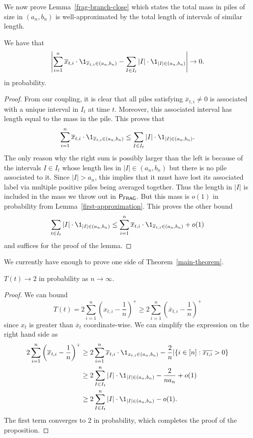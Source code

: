 \documentclass[12pt]{article}
\begin{document}
We now prove Lemma~\ref{frag-branch-close} which states the total mass in piles of size in $(a_n, b_n)$ is well-approximated by the total length of intervals of similar length. 
\begin{lem} \label{frag-branch-close}
	We have that
	\[
		\left | \sum_{i = 1}^n \overline{x}_{t, i} \cdot \1_{\overline{x}_{t, i} \in (a_n, b_n)} - \sum_{I \in I_t} |I| \cdot \1_{|I| \in (a_n, b_n)} \right | \to 0. 
	\]
	in probability. 
\end{lem}	
\begin{proof}
	From our coupling, it is clear that all piles satisfying $\overline{x}_{t, i} \neq 0$ is associated with a unique interval in $I_t$ at time $t$. Moreover, this associated interval has length equal to the mass in the pile. This proves that 
	\[
		\sum_{i = 1}^n \overline{x}_{t, i} \cdot \1_{\overline{x}_{t, i} \in (a_n, b_n)} \leq \sum_{I \in I_t} |I| \cdot \1_{|I| \in (a_n, b_n)}.
	\] 
	The only reason why the right sum is possibly larger than the left is because of the intervals $I \in I_t$ whose length lies in $|I| \in (a_n, b_n)$ but there is no pile associated to it. Since $|I| > a_n$, this implies that it must have lost its associated label via multiple positive piles being averaged together. Thus the length in $|I|$ is included in the mass we throw out in $\mathsf{P}_{\mathsf{FRAG}}$. But this mass is $o(1)$ in probability from Lemma~\ref{first-approximation}. This proves the other bound
	\[
		\sum_{t \in I_t} |I| \cdot \1_{|I| \in (a_n, b_n)} \leq \sum_{i = 1}^n \overline{x}_{t, i} \cdot \1_{\overline{x}_{t, i} \in (a_n, b_n)} + o(1) 
	\]
	and suffices for the proof of the lemma. 
\end{proof}

We currently have enough to prove one side of Theorem~\ref{main-theorem}.

\begin{prop}
	$T(t) \to 2$ in probability as $n \to \infty$. 
\end{prop}
\begin{proof}
	We can bound
	\[
		T(t) = 2 \sum_{i = 1}^n \left ( x_{t, i} - \frac{1}{n} \right )^+ \geq 2 \sum_{i = 1}^n \left ( \overline{x}_{t, i} - \frac{1}{n} \right )^+
	\]
	since $x_t$ is greater than $\overline{x}_t$ coordinate-wise. We can simplify the expression on the right hand side as
	\begin{align*}
		2 \sum_{i = 1}^n \left ( \overline{x}_{t, i} - \frac{1}{n} \right )^+ & \geq 2 \sum_{i = 1}^n \overline{x}_{t, i} \cdot \1_{x_{t, i} \in (a_n, b_n)} - \frac{2}{n} | \{ i \in [n] : \overline{x_{t, i}} > 0\} \\
		& \geq 2 \sum_{I \in I_t}^n |I| \cdot \1_{|I| \in (a_n, b_n)} - \frac{2}{n a_n} + o(1) \\
		& \geq 2 \sum_{I \in I_t}^n |I| \cdot \1_{|I| \in (a_n, b_n)} - o(1). 
	\end{align*}
	The first term converges to $2$ in probability, which completes the proof of the proposition. 
\end{proof}
\end{document}
